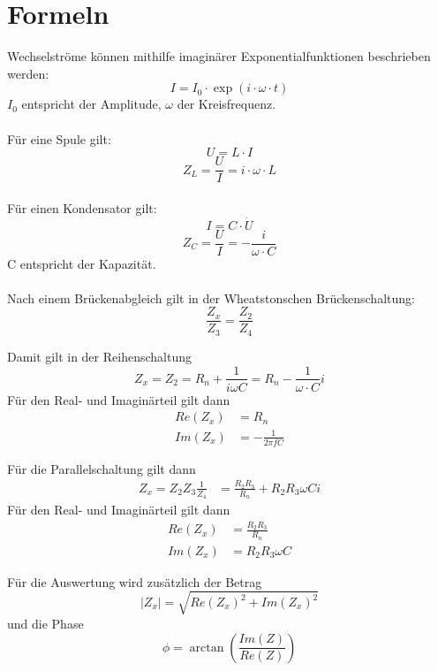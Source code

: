 \chapter{Formeln}
Wechselströme können mithilfe imaginärer Exponentialfunktionen beschrieben werden:\\
\begin{equation}
I=I_0 \cdot \exp(i \cdot \omega \cdot t)
\end{equation}
$I_0$ entspricht der Amplitude, $\omega$ der Kreisfrequenz.\\
\\
Für eine Spule gilt:\\
\begin{equation}
U=L \cdot I
\end{equation}
\begin{equation}
Z_L= \frac{U}{I} = i \cdot \omega \cdot L
\end{equation}
\\
Für einen Kondensator gilt:\\
\begin{equation}
I = C\cdot\dot{U}
\end{equation}
 \begin{equation}
 Z_C = \frac{U}{I} = -\frac{i}{\omega \cdot C}
 \end{equation}
C entspricht der Kapazität.\\
\\

Nach einem Brückenabgleich gilt in der Wheatstonschen Brückenschaltung:
\begin{equation}
	\frac{Z_x}{Z_3} = \frac{Z_2}{Z_4}
\end{equation}

Damit gilt in der Reihenschaltung
\begin{equation}
	Z_x = Z_2 = R_n + \frac{1}{i\omega C} = 
R_n - \frac{1}{\omega \cdot C} i 
\end{equation}
Für den Real- und Imaginärteil gilt dann 
\begin{align}
	Re(Z_x) &= R_n \\
	Im(Z_x) &= - \frac{1}{2\pi f C}
\end{align}

Für die Parallelschaltung gilt dann
\begin{align}
 Z_x = Z_2Z_3 \frac{1}{Z_4} &= {\frac{R_2R_3}{R_n} +  R_2R_3 \omega C i} 
\end{align}
Für den Real- und Imaginärteil gilt dann 
\begin{align}
	Re(Z_x) &=  \frac{R_2R_3}{R_n}\\
	Im(Z_x) &= R_2R_3 \omega C 
\end{align}

Für die Auswertung wird zusätzlich der Betrag
\begin{equation}
	|Z_x| = \sqrt{Re(Z_x)^2 + Im(Z_x)^2}
\end{equation}
und die Phase 
\begin{equation}
	\phi =  \arctan\left(\frac{Im(Z)}{Re(Z)}\right)
\end{equation}
	\pagebreak